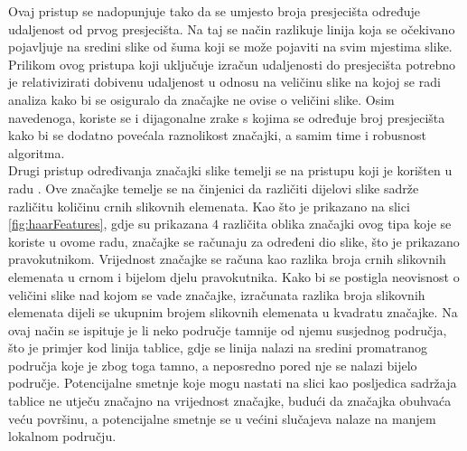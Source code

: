 \documentclass[times, utf8, zavrsni, numeric]{fer}
\begin{document}
Ovaj pristup se nadopunjuje tako da se umjesto broja presjecišta određuje udaljenost od prvog presjecišta.
Na taj se način razlikuje linija koja se očekivano pojavljuje na sredini slike od šuma koji se može pojaviti na svim mjestima slike.
Prilikom ovog pristupa koji uključuje izračun udaljenosti do presjecišta potrebno je relativizirati dobivenu udaljenost u odnosu na veličinu slike na kojoj se radi analiza kako bi se osiguralo da značajke ne ovise o veličini slike.
Osim navedenoga, koriste se i dijagonalne zrake s kojima se određuje broj presjecišta kako bi se dodatno povećala raznolikost značajki, a samim time i robusnost algoritma.\\

Drugi pristup određivanja značajki slike temelji se na pristupu koji je korišten u radu \cite{ViolaJones}.
Ove značajke temelje se na činjenici da različiti dijelovi slike sadrže različitu količinu crnih slikovnih elemenata.
Kao što je prikazano na slici \ref{fig:haarFeatures}, gdje su prikazana $4$ različita oblika značajki ovog tipa koje se koriste u ovome radu, značajke se računaju za određeni dio slike, što je prikazano pravokutnikom.
Vrijednost značajke se računa kao razlika broja crnih slikovnih elemenata u crnom i bijelom djelu pravokutnika.
Kako bi se postigla neovisnost o veličini slike nad kojom se vade značajke, izračunata razlika broja slikovnih elemenata dijeli se ukupnim brojem slikovnih elemenata u kvadratu značajke.
Na ovaj način se ispituje je li neko područje tamnije od njemu susjednog područja, što je primjer kod linija tablice, gdje se linija nalazi na sredini promatranog područja koje je zbog toga tamno, a neposredno pored nje se nalazi bijelo područje. 
Potencijalne smetnje koje mogu nastati na slici kao posljedica sadržaja tablice ne utječu značajno na vrijednost značajke, budući da značajka obuhvaća veću površinu, a potencijalne smetnje se u većini slučajeva nalaze na manjem lokalnom području.
\end{document}
